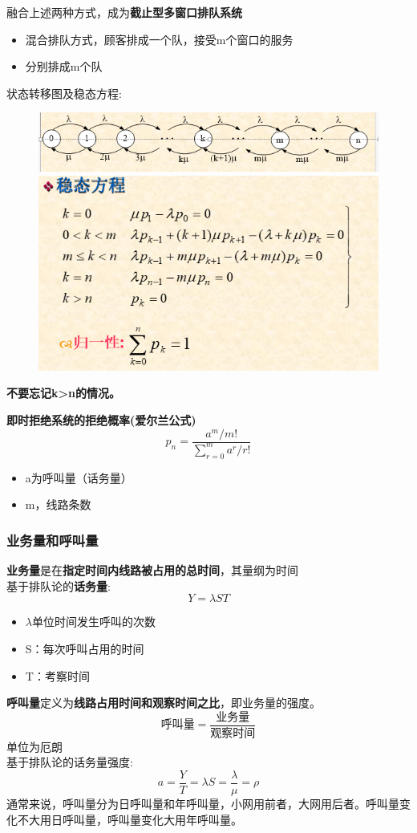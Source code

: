 融合上述两种方式，成为\textbf{截止型多窗口排队系统}\\
\begin{itemize}
	\item 混合排队方式，顾客排成一个队，接受m个窗口的服务
	\item 分别排成m个队
\end{itemize}
状态转移图及稳态方程:
\begin{figure}[H]
	\centering
	\includegraphics[width=0.7\linewidth]{figures/screenshot029}
	\includegraphics[width=0.7\linewidth]{figures/screenshot030}
	\caption{}
	\label{fig:screenshot029}
\end{figure}
\textbf{不要忘记k>n的情况。}


\textbf{即时拒绝系统的拒绝概率(爱尔兰公式)}
\[
 	p_n = \frac{a^m/{m!}}{\sum_{r=0}^{m}a^r/{r!}}
\]
\begin{itemize}
	\item a为呼叫量（话务量）
	\item m，线路条数
\end{itemize}
\subsubsection{业务量和呼叫量}
\textbf{业务量}是在\textbf{指定时间内线路被占用的总时间}，其量纲为时间\\
基于排队论的\textbf{话务量}:
\begin{equation}\label{key}
Y = \lambda S T
\end{equation}
\begin{itemize}
	\item $ \lambda $单位时间发生呼叫的次数
	\item S：每次呼叫占用的时间
	\item T：考察时间
\end{itemize}
\textbf{呼叫量}定义为\textbf{线路占用时间和观察时间之比}，即业务量的强度。
\begin{equation}\label{key}
\text{呼叫量} = \frac{\text{业务量}}{\text{观察时间}}
\end{equation}
单位为厄朗\\
基于排队论的话务量强度:
\begin{equation}\label{key}
a = \frac{Y}{T} = \lambda S = \frac{\lambda}{\mu} = \rho
\end{equation}
通常来说，呼叫量分为日呼叫量和年呼叫量，小网用前者，大网用后者。呼叫量变化不大用日呼叫量，呼叫量变化大用年呼叫量。
